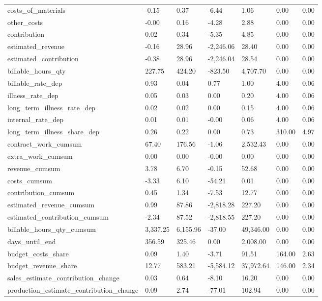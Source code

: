 \begin{landscape}
\begin{longtable}[h!]{lllllll}
costs_of_materials & -0.15 & 0.37 & -6.44 & 1.06 & 0.00 & 0.00 \\
other_costs & -0.00 & 0.16 & -4.28 & 2.88 & 0.00 & 0.00 \\
contribution & 0.02 & 0.34 & -5.35 & 4.85 & 0.00 & 0.00 \\
estimated_revenue & -0.16 & 28.96 & -2,246.06 & 28.40 & 0.00 & 0.00 \\
estimated_contribution & -0.38 & 28.96 & -2,246.04 & 28.54 & 0.00 & 0.00 \\
billable_hours_qty & 227.75 & 424.20 & -823.50 & 4,707.70 & 0.00 & 0.00 \\
billable_rate_dep & 0.93 & 0.04 & 0.77 & 1.00 & 4.00 & 0.06 \\
illness_rate_dep & 0.05 & 0.03 & 0.00 & 0.20 & 4.00 & 0.06 \\
long_term_illness_rate_dep & 0.02 & 0.02 & 0.00 & 0.15 & 4.00 & 0.06 \\
internal_rate_dep & 0.01 & 0.01 & -0.00 & 0.06 & 4.00 & 0.06 \\
long_term_illness_share_dep & 0.26 & 0.22 & 0.00 & 0.73 & 310.00 & 4.97 \\
contract_work_cumsum & 67.40 & 176.56 & -1.06 & 2,532.43 & 0.00 & 0.00 \\
extra_work_cumsum & 0.00 & 0.00 & -0.00 & 0.00 & 0.00 & 0.00 \\
revenue_cumsum & 3.78 & 6.70 & -0.15 & 52.68 & 0.00 & 0.00 \\
costs_cumsum & -3.33 & 6.10 & -54.21 & 0.01 & 0.00 & 0.00 \\
contribution_cumsum & 0.45 & 1.34 & -7.53 & 12.77 & 0.00 & 0.00 \\
estimated_revenue_cumsum & 0.99 & 87.86 & -2,818.28 & 227.20 & 0.00 & 0.00 \\
estimated_contribution_cumsum & -2.34 & 87.52 & -2,818.55 & 227.20 & 0.00 & 0.00 \\
billable_hours_qty_cumsum & 3,337.25 & 6,155.96 & -37.00 & 49,346.00 & 0.00 & 0.00 \\
days_until_end & 356.59 & 325.46 & 0.00 & 2,008.00 & 0.00 & 0.00 \\
budget_costs_share & 0.09 & 1.40 & -3.71 & 91.51 & 164.00 & 2.63 \\
budget_revenue_share & 12.77 & 583.21 & -5,584.12 & 37,972.64 & 146.00 & 2.34 \\
sales_estimate_contribution_change & 0.03 & 0.64 & -8.10 & 16.20 & 0.00 & 0.00 \\
production_estimate_contribution_change & 0.09 & 2.74 & -77.01 & 102.94 & 0.00 & 0.00 \\

\end{longtable}
\end{landscape}

